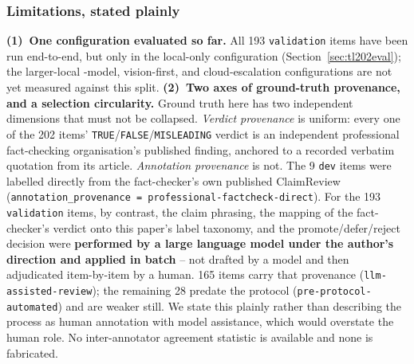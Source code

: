 \documentclass[conference]{IEEEtran}
\begin{document}
\subsubsection{Limitations, stated plainly}
\textbf{(1)~One configuration evaluated so far.} All 193
\texttt{validation} items have been run end-to-end, but only in the
local-only configuration (Section~\ref{sec:tl202eval}); the larger-local
-model, vision-first, and cloud-escalation configurations are not yet
measured against this split. \textbf{(2)~Two axes of ground-truth provenance, and a selection
circularity.} Ground truth here has two independent dimensions that must
not be collapsed. \emph{Verdict provenance} is uniform: every one of the
202 items' \texttt{TRUE}/\texttt{FALSE}/\texttt{MISLEADING} verdict is an
independent professional fact-checking organisation's published finding,
anchored to a recorded verbatim quotation from its article.
\emph{Annotation provenance} is not. The 9 \texttt{dev} items were
labelled directly from the fact-checker's own published ClaimReview
(\texttt{annotation\_provenance = professional-factcheck-direct}). For
the 193 \texttt{validation} items, by contrast, the claim phrasing, the
mapping of the fact-checker's verdict onto this paper's label taxonomy,
and the promote/defer/reject decision were \textbf{performed by a large
language model under the author's direction and applied in batch} --
not drafted by a model and then adjudicated item-by-item by a human.
165 items carry that provenance
(\texttt{llm-assisted-review}); the remaining 28 predate the protocol
(\texttt{pre-protocol-automated}) and are weaker still. We state this
plainly rather than describing the process as human annotation with
model assistance, which would overstate the human role. No
inter-annotator agreement statistic is available and none is fabricated.
\end{document}
